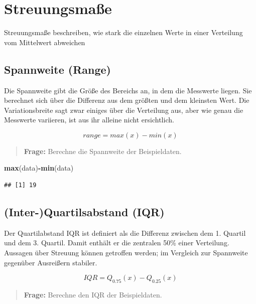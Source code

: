 \documentclass[
]{book}
\newenvironment{Shaded}{\begin{snugshade}}{\end{snugshade}}
\newcommand{\KeywordTok}[1]{\textcolor[rgb]{0.13,0.29,0.53}{\textbf{#1}}}
\newcommand{\NormalTok}[1]{#1}
\newcommand{\OperatorTok}[1]{\textcolor[rgb]{0.81,0.36,0.00}{\textbf{#1}}}
\begin{document}
\hypertarget{streuungsmauxdfe}{%
\section{Streuungsmaße}\label{streuungsmauxdfe}}

Streuungsmaße beschreiben, wie stark die einzelnen Werte in einer Verteilung vom Mittelwert abweichen

\hypertarget{spannweite-range}{%
\subsection{Spannweite (Range)}\label{spannweite-range}}

Die Spannweite gibt die Größe des Bereichs an, in dem die Messwerte liegen. Sie berechnet sich über die Differenz aus dem größten und dem kleinsten Wert. Die Variationsbreite sagt zwar einiges über die Verteilung aus, aber wie genau die Messwerte variieren, ist aus ihr alleine nicht ersichtlich.

\[ range = max(x) - min(x) \]

\begin{quote}
\textbf{Frage:} Berechne die Spannweite der Beispieldaten.
\end{quote}

\begin{Shaded}
\begin{Highlighting}[]
\KeywordTok{max}\NormalTok{(data)}\OperatorTok{-}\KeywordTok{min}\NormalTok{(data)}
\end{Highlighting}
\end{Shaded}

\begin{verbatim}
## [1] 19
\end{verbatim}

\hypertarget{inter-quartilsabstand-iqr}{%
\subsection{(Inter-)Quartilsabstand (IQR)}\label{inter-quartilsabstand-iqr}}

Der Quartilabstand IQR ist definiert als die Differenz zwischen dem 1. Quartil und dem 3. Quartil. Damit enthält er die zentralen 50\% einer Verteilung. Aussagen über Streuung können getroffen werden; im Vergleich zur Spannweite gegenüber Ausreißern stabiler.

\[ IQR = Q_{0.75}(x)-Q_{0.25}(x) \]

\begin{quote}
\textbf{Frage:} Berechne den IQR der Beispieldaten.
\end{quote}
\end{document}
